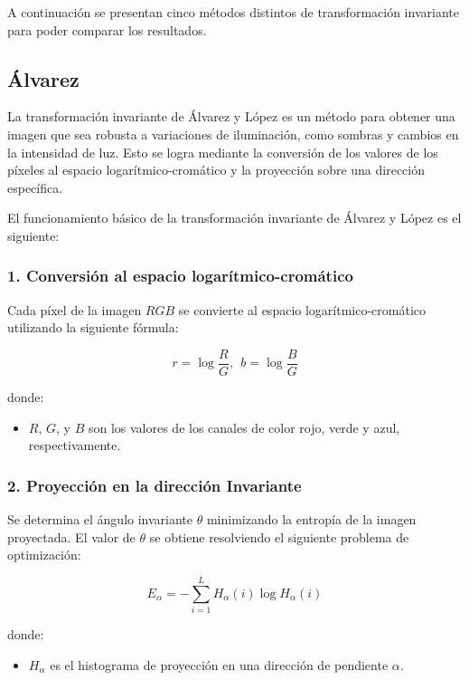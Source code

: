 A continuación se presentan cinco métodos distintos de transformación invariante para poder comparar los resultados.

\subsection{Álvarez}\label{alvarez}
La transformación invariante de Álvarez y López \cite{alvarez2011} es un método para obtener una imagen que sea robusta a variaciones de iluminación, como sombras y cambios en la intensidad de luz. Esto se logra mediante la conversión de los valores de los píxeles al espacio logarítmico-cromático y la proyección sobre una dirección específica.

El funcionamiento básico de la transformación invariante de Álvarez y López es el siguiente:

\subsubsection{1. Conversión al espacio logarítmico-cromático}

Cada píxel de la imagen $RGB$ se convierte al espacio logarítmico-cromático utilizando la siguiente fórmula:

$$r=\log \frac{R}{G},~~b=\log \frac{B}{G}$$

donde:

\begin{itemize}
\setlength{\itemsep}{-1ex}
   \item{\begin{flushleft} $R$, $G$, y $B$ son los valores de los canales de color rojo, verde y azul, respectivamente. \end{flushleft}}
\end{itemize}

\subsubsection{2. Proyección en la dirección Invariante}

Se determina el ángulo invariante $\theta$ minimizando la entropía de la imagen proyectada. El valor de $\theta$ se obtiene resolviendo el siguiente problema de optimización:

$$E_{\alpha } =-\sum_{i=1}^L H_{\alpha } (i)\log H_{\alpha } (i)$$

donde:

\begin{itemize}
\setlength{\itemsep}{-1ex}
   \item{\begin{flushleft} $H_{\alpha }$ es el histograma de proyección en una dirección de pendiente $\alpha$. \end{flushleft}}
\end{itemize}


